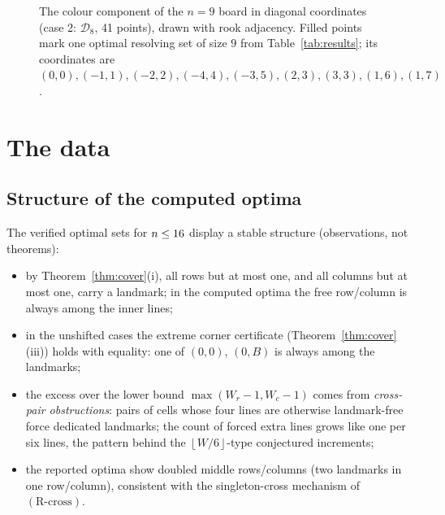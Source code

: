 \documentclass[12pt]{article}
\theoremstyle{definition}
\newcommand{\BB}{\mathcal{B}}
\newcommand{\DD}{\mathcal{D}}
\newcommand{\floor}[1]{\left\lfloor #1 \right\rfloor}
\newcommand{\RRx}{\ensuremath{\mathrm{(R\text{-}cross)}}}
\begin{document}
\begin{figure}[t]
\centering

\caption{The colour component of the $n=9$ board in diagonal coordinates (case 2: $\DD_{8}$, 41 points), drawn with rook adjacency. Filled points mark one optimal resolving set of size $9$ from Table~\ref{tab:results}; its coordinates are $(0,0),(-1,1),(-2,2),(-4,4),(-3,5),(2,3),(3,3),(1,6),(1,7)$.}
\label{fig:figN9}
\end{figure}

\section{The data}\label{sec:data}

\begin{table}[t]
\centering
\caption{Exact metric dimensions of the two colour components of the bishop's graph $\BB_n$ for $1\le n\le\nmaxverified$ (Theorem~\ref{thm:computed}). The ``conj.''\ columns report whether the exact value equals the conjectured formula of Conjecture~\ref{conj:forms} (checked by the artefact's regression script).}
\label{tab:results}
\small

\end{table}

\subsection{Structure of the computed optima}\label{sec:pictures}

The verified optimal sets for $n\le16$ display a stable structure (observations, not theorems):
\begin{itemize}[leftmargin=6mm,itemsep=2pt]
\item by Theorem~\ref{thm:cover}(i), all rows but at most one, and all columns but at most one, carry a landmark; in the computed optima the free row/column is always among the inner lines;
\item in the unshifted cases the extreme corner certificate (Theorem~\ref{thm:cover}(iii)) holds with equality: one of $(0,0)$, $(0,B)$ is always among the landmarks;
\item the excess over the lower bound $\max(W_r-1,W_c-1)$ comes from \emph{cross-pair obstructions}: pairs of cells whose four lines are otherwise landmark-free force dedicated landmarks; the count of forced extra lines grows like one per six lines, the pattern behind the $\floor{W/6}$-type conjectured increments;
\item the reported optima show doubled middle rows/columns (two landmarks in one row/column), consistent with the singleton-cross mechanism of \RRx.
\end{itemize}
\end{document}
